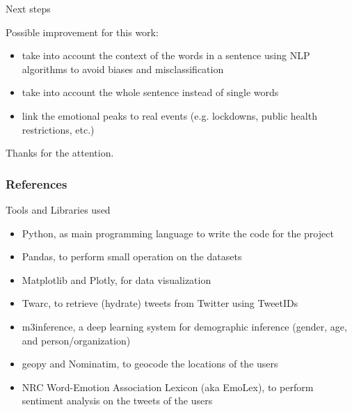 \documentclass[9pt,aspectratio=1610]{beamer}  %
\begin{document}
\begin{frame}{Next steps}
    
    Possible improvement for this work:
    
    \begin{itemize}
        \item take into account the context of the words in a sentence using NLP algorithms to avoid biases and misclassification
        \item take into account the whole sentence instead of single words
        \item link the emotional peaks to real events (e.g. lockdowns, public health restrictions, etc.)
    \end{itemize}
    
\end{frame}

\begin{frame}

    \begin{center}
        \Large{Thanks for the attention.}
    \end{center}

\end{frame}

\begin{frame}
        \frametitle{References}
        \printbibliography
\end{frame}












\begin{frame}{Tools and Libraries used}

    \begin{itemize}
        \item Python, as main programming language to write the code for the project
        \item Pandas, to perform small operation on the datasets
        \item Matplotlib and Plotly, for data visualization
        \item Twarc, to retrieve (hydrate) tweets from Twitter using TweetIDs
        \item m3inference, a deep learning system for demographic inference (gender, age, and person/organization)
        \item geopy and Nominatim, to geocode the locations of the users
        \item NRC Word-Emotion Association Lexicon (aka EmoLex), to perform sentiment analysis on the tweets of the users
    \end{itemize}
    
\end{frame}
\end{document}
